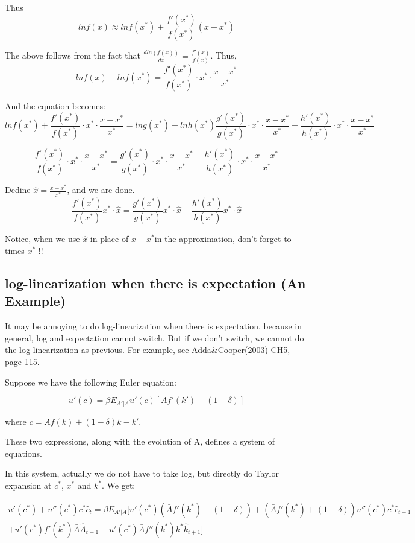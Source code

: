 \documentclass{book}
\theoremstyle{plain}
\theoremstyle{definition}
\begin{document}
Thus 
\[lnf(x) \approx lnf(x^*)+\frac{f'(x^*)}{f(x^*)}(x-x^*)\]

The above follows from the fact that $\frac{dln(f(x))}{dx}=\frac{f'(x)}{f(x)}$. Thus,
\[lnf(x)-lnf(x^*)=\frac{f'(x^*)}{f(x^*)} \cdot x^* \cdot \frac{x-x^*}{x^*}\]

And the equation becomes:
\[lnf(x^*)+\frac{f'(x^*)}{f(x^*)} \cdot x^* \cdot \frac{x-x^*}{x^*}=lng(x^*)-lnh(x^*)
\frac{g'(x^*)}{g(x^*)} \cdot x^* \cdot \frac{x-x^*}{x^*}-
\frac{h'(x^*)}{h(x^*)} \cdot x^* \cdot \frac{x-x^*}{x^*}\]

\[\frac{f'(x^*)}{f(x^*)} \cdot x^* \cdot \frac{x-x^*}{x^*}=
\frac{g'(x^*)}{g(x^*)} \cdot x^* \cdot \frac{x-x^*}{x^*}-
\frac{h'(x^*)}{h(x^*)} \cdot x^* \cdot \frac{x-x^*}{x^*}\]

Dedine $\hat x=\frac{x-x^*}{x^*}$, and we are done.
\[\frac{f'(x^*)}{f(x^*)} x^* \cdot \hat x=
\frac{g'(x^*)}{g(x^*)} x^* \cdot \hat x-
\frac{h'(x^*)}{h(x^*)} x^* \cdot \hat x\]

Notice, when we use $\hat x$ in place of $x-x^*$in the approximation,
don't forget to times $x^*$ !!\\


\subsection{log-linearization when there is expectation (An Example)}

It may be annoying to do log-linearization when there is expectation,
because in general,
log and expectation cannot switch.
But if we don't switch, we cannot do the log-linearization as previous.
For example, see Adda\&Cooper(2003) CH5, page 115.

Suppose we have the following Euler equation:

\[u'(c)=\beta E_{A'|A}u'(c)[Af'(k')+(1-\delta)]\]

where $c=Af(k)+(1-\delta)k-k'$.

These two expressions, along with the evolution of A,
defines a system of equations.

In this system, actually we do not have to take log,
but directly do Taylor expansion at $c^*$, $x^*$ and $k^*$.
We get:

\begin{multline}
u'(c^*)+u''(c^*)c^*\hat c_t=
\beta E_{A'|A}[u'(c^*)(\bar Af'(k^*)+(1-\delta))
+(\bar Af'(k^*)+(1-\delta))u''(c^*)c^*\hat c_{t+1}\\
+u'(c^*)f'(k^*)\bar A\hat A_{t+1}+
u'(c^*)\bar Af''(k^*)k^* \hat k_{t+1}]
\end{multline}
\end{document}
